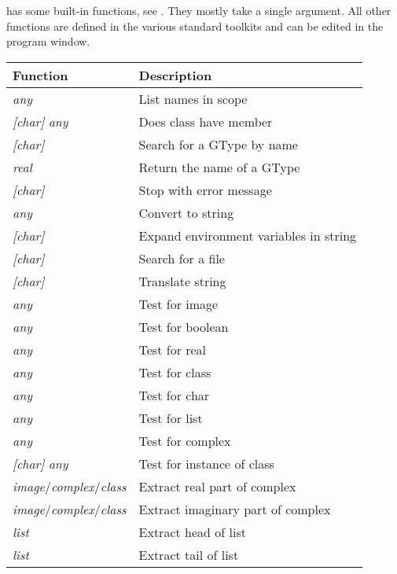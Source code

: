 \nip{} has some built-in functions, see . They mostly 
take a single argument. All other functions are defined in the various
standard toolkits and can be edited in the program window.

\begin{tab2}
\begin{center}
\begin{tabular}{||l|l||}
\hline
Function & Description \\
\hline
\ct{dir} \textit{any}		& List names in scope \\
\ct{has\_member} \textit{[char]} \textit{any}	& 
				Does class have member \\
\hline
\ct{name2gtype} \textit{[char]}	& Search for a GType by name \\
\ct{gtype2name} \textit{real}	& Return the name of a GType \\
\hline
\ct{error} \textit{[char]}	& Stop with error message \\
\ct{print} \textit{any}		& Convert to string \\
\ct{expand} \textit{[char]}	& Expand environment variables in string \\
\ct{search} \textit{[char]}	& Search for a file \\
\ct{\_} \textit{[char]}		& Translate string \\
\hline
\ct{is\_image} \textit{any}	& Test for image \\
\ct{is\_bool} \textit{any}	& Test for boolean \\
\ct{is\_real} \textit{any}	& Test for real	\\
\ct{is\_class} \textit{any}	& Test for class \\
\ct{is\_char} \textit{any}	& Test for char	\\
\ct{is\_list} \textit{any}	& Test for list	\\
\ct{is\_complex} \textit{any}	& Test for complex \\
\ct{is\_instanceof} \textit{[char]} \textit{any}	& 
				Test for instance of class	\\
\hline
\ct{re} \textit{image}/\textit{complex}/\textit{class} & 
				Extract real part of complex	\\
\ct{im}	\textit{image}/\textit{complex}/\textit{class} &
				Extract imaginary part of complex \\
\ct{hd} \textit{list}		& Extract head of list \\
\ct{tl}	\textit{list}		& Extract tail of list \\


\end{tabular}
\end{center}
\end{tab2}
